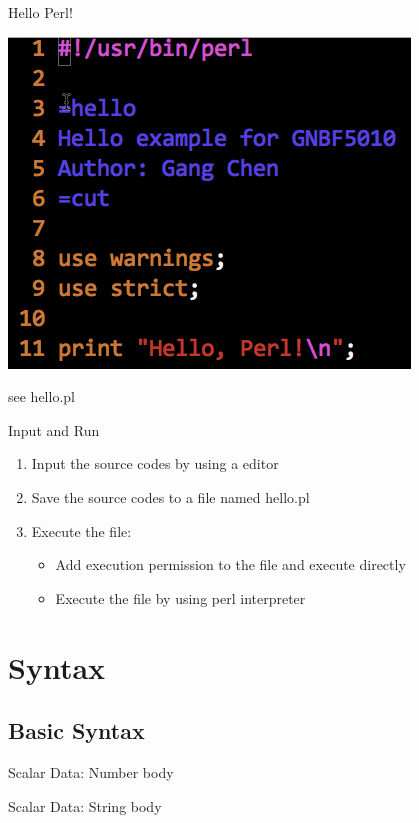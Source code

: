 \documentclass[UTF8]{beamer}
\begin{document}
\begin{frame}[t]{Hello Perl!}
  \centerline{\includegraphics[height=.6\textheight]{hello.png}}
  see hello.pl
\end{frame}

\begin{frame}[t]{Input and Run}
  \begin{enumerate}
    \item Input the source codes by using a editor
    \item Save the source codes to a file named hello.pl
    \item Execute the file:
    \begin{itemize}
      \item Add execution permission to the file and execute directly
      \item Execute the file by using perl interpreter
    \end{itemize}
  \end{enumerate}
\end{frame}

\section{Syntax}

\subsection{Basic Syntax}
\begin{frame}[t]{Scalar Data: Number}
  body
\end{frame}

\begin{frame}[t]{Scalar Data: String}
  body
\end{frame}
\end{document}
